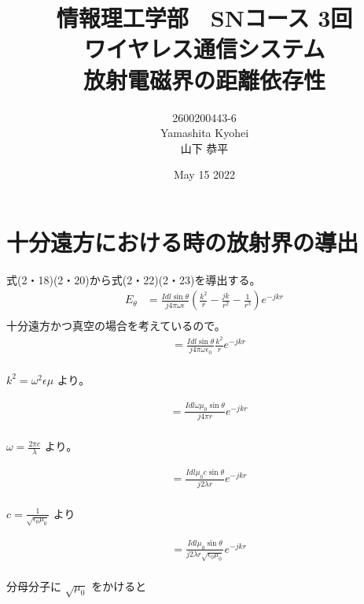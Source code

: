 \documentclass[dvipdfmx,autodetect-engine,titlepage]{jsarticle}
\title{情報理工学部　SNコース 3回\\
ワイヤレス通信システム\\
放射電磁界の距離依存性}
\author{2600200443-6\\Yamashita Kyohei\\山下 恭平}
\date{May 15 2022}
\begin{document}
\maketitle

\section{十分遠方における時の放射界の導出}

式(2・18)(2・20)から式(2・22)(2・23)を導出する。\\

\begin{align*}
  E_{\theta } &= \frac{Idl\sin \theta }{j4\pi \omega \epsilon}(\frac{k^2}{r}-\frac{jk}{r^2}-\frac{1}{r^3})e^{-jkr}\\
\end{align*}
十分遠方かつ真空の場合を考えているので。\\

\begin{align*}
  &= \frac{Idl\sin \theta }{j4\pi \omega \epsilon_0}\frac{k^2}{r}e^{-jkr}\\
\end{align*}

\begin{math}
  k^2 = \omega ^2 \epsilon \mu
\end{math}
より。

\begin{align*}
  &= \frac{Idl\omega \mu_0 \sin \theta }{j4\pi r}e^{-jkr}\\
\end{align*}

\begin{math}
  \omega = \frac{2\pi c}{\lambda }
\end{math}
より。

\begin{align*}
  &= \frac{Idl \mu_0 c\sin \theta }{j2\lambda r}e^{-jkr}\\
\end{align*}

\begin{math}
  c = \frac{1}{\sqrt{\epsilon _{0}\mu _0 } }
\end{math}
より

\begin{align*}
  &= \frac{Idl \mu_0 \sin \theta }{j2\lambda r \sqrt{\epsilon _{0}\mu _0 }}e^{-jkr}\\
\end{align*}

分母分子に
\begin{math}
  \sqrt{\mu _0} 
\end{math}
をかけると
\end{document}

